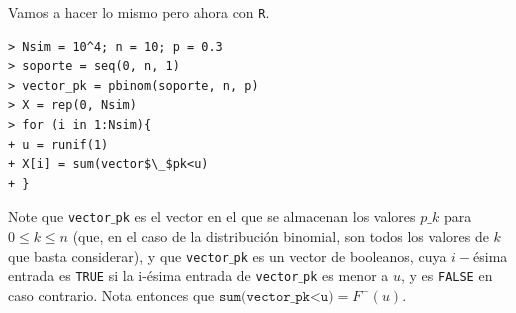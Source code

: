 Vamos a hacer lo mismo pero ahora con \texttt{R}.

\begin{verbatim}
> Nsim = 10^4; n = 10; p = 0.3
> soporte = seq(0, n, 1)
> vector_pk = pbinom(soporte, n, p)
> X = rep(0, Nsim) 
> for (i in 1:Nsim){
+ u = runif(1)
+ X[i] = sum(vector$\_$pk<u)
+ }
\end{verbatim}
Note que \texttt{vector$\_$pk} es el vector en el que
se almacenan los valores $p\_{k}$ para
$0 \leq k \leq n$ (que, en el caso de la distribución
binomial, son todos los valores de $k$ que basta considerar),
y que \texttt{vector$\_$pk} es un vector de booleanos,
cuya $i-$ésima entrada es \texttt{TRUE} si la i-ésima
entrada de \texttt{vector$\_$pk} es menor a $u$, y es 
\texttt{FALSE} en caso contrario. Nota entonces que
$\texttt{sum(vector\_pk<u)} = F^{-}(u)$. 
